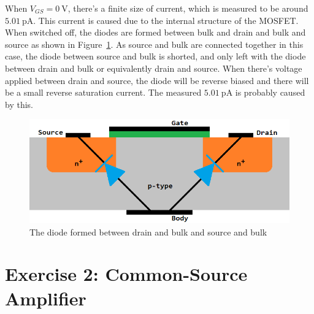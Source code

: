 \documentclass[12pt]{article}   %
\begin{document}
	When $V_{GS} = \SI{0}{\volt}$, there's a finite size of current, which is measured to be around $\SI{5.01}{\pico\ampere}$. This current is caused due to the internal structure of the MOSFET. When switched off, the diodes are formed between bulk and drain and bulk and source as shown in Figure~\ref{fig:bodyDiode}. As source and bulk are connected together in this case, the diode between source and bulk is shorted, and only left with the diode between drain and bulk or equivalently drain and source. When there's voltage applied between drain and source, the diode will be reverse biased and there will be a small reverse saturation current. The measured $\SI{5.01}{\pico \ampere}$ is probably caused by this.
	
	\begin{figure}[htbp]
		\centering
		\includegraphics[width = 0.5\linewidth]{Figures/E1_NMOS_Characteristic/Body_diode}
		\caption{The diode formed between drain and bulk and source and bulk}
		\label{fig:bodyDiode}
	\end{figure}
	
	\newpage
	
	\section{Exercise 2: Common-Source Amplifier}
	
\end{document}
